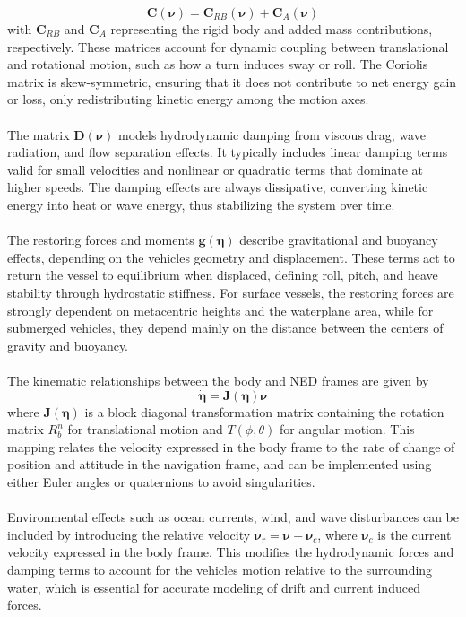 $$
    \mathbf{C}(\boldsymbol{\nu}) = \mathbf{C}_{RB}(\boldsymbol{\nu}) + \mathbf{C}_A(\boldsymbol{\nu})
$$
with $\mathbf{C}_{RB}$ and $\mathbf{C}_A$ representing the rigid body and added mass contributions, respectively. These matrices account for dynamic coupling between translational and rotational motion, such as how a turn induces sway or roll. The Coriolis matrix is skew-symmetric, ensuring that it does not contribute to net energy gain or loss, only redistributing kinetic energy among the motion axes.  
\\ \\
The matrix $\mathbf{D}(\boldsymbol{\nu})$ models hydrodynamic damping from viscous drag, wave radiation, and flow separation effects. It typically includes linear damping terms valid for small velocities and nonlinear or quadratic terms that dominate at higher speeds. The damping effects are always dissipative, converting kinetic energy into heat or wave energy, thus stabilizing the system over time.  
\\ \\
The restoring forces and moments $\mathbf{g}(\boldsymbol{\eta})$ describe gravitational and buoyancy effects, depending on the vehicles geometry and displacement. These terms act to return the vessel to equilibrium when displaced, defining roll, pitch, and heave stability through hydrostatic stiffness. For surface vessels, the restoring forces are strongly dependent on metacentric heights and the waterplane area, while for submerged vehicles, they depend mainly on the distance between the centers of gravity and buoyancy.  
\\ \\
The kinematic relationships between the body and NED frames are given by
$$
    \dot{\boldsymbol{\eta}} = \mathbf{J}(\boldsymbol{\eta})\boldsymbol{\nu}
$$
where $\mathbf{J}(\boldsymbol{\eta})$ is a block diagonal transformation matrix containing the rotation matrix $R_b^n$ for translational motion and $T(\phi, \theta)$ for angular motion. This mapping relates the velocity expressed in the body frame to the rate of change of position and attitude in the navigation frame, and can be implemented using either Euler angles or quaternions to avoid singularities.  
\\ \\
Environmental effects such as ocean currents, wind, and wave disturbances can be included by introducing the relative velocity $\boldsymbol{\nu}_r = \boldsymbol{\nu} - \boldsymbol{\nu}_c$, where $\boldsymbol{\nu}_c$ is the current velocity expressed in the body frame. This modifies the hydrodynamic forces and damping terms to account for the vehicles motion relative to the surrounding water, which is essential for accurate modeling of drift and current induced forces.  
